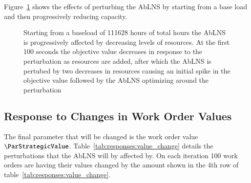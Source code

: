 Figure~\ref{fig:responses:resource-subtraction} shows the effects of perturbing
the AbLNS by starting from a base load  and then progressively reducing
capacity.

\begin{figure}[H]%
	\centering
	\resizebox{10cm}{!}{
		
	}
	\caption{Starting from a baseload of 111628 hours of total hours the AbLNS is 
	progressively affected by decreasing levels of resources. At the first 
	100 seconds the objective value decreases in response to the perturbation
	as resources are added, after which the AbLNS is pertubed by two decreases
	in resources causing an initial spike in the objective value followed 
	by the AbLNS optimizing around the perturbation}
	\label{fig:responses:resource-subtraction}
\end{figure}

\subsection{Response to Changes in Work Order Values}\label{sec:results:strategic_value_changes}
The final parameter that will be changed is the work order value $
\ParStrategicValue$. Table~\ref{tab:responses:value_change} details the
perturbations that the AbLNS will by affected by. On each iteration 100 work
orders are having their values changed by the amount  shown in the 4th row of
table~\ref{tab:responses:value_change}.

